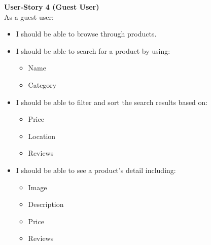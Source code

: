 \documentclass[11pt]{article}
\newcounter{use case ID}
\begin{document}
\textbf{User-Story 4 (Guest User)} \\
As a guest user:
\begin{itemize}
    \item I should be able to browse through products.
    \item I should be able to search for a product by using:
    \begin{itemize}
        \item Name
        \item Category
    \end{itemize}
    \item I should be able to filter and sort the search results based on:
        \begin{itemize}
            \item Price
            \item Location
            \item {}Reviews
        \end{itemize}
    \item I should be able to see a product's detail including:
        \begin{itemize}
            \item Image
            \item Description
            \item Price
            \item {}Reviews
        \end{itemize}
\end{itemize}
\end{document}
